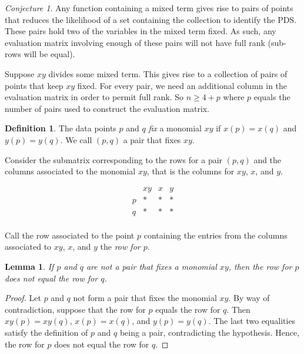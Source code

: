 \documentclass{amsart}
\newtheorem{lem}[thm]{Lemma}
\theoremstyle{definition}
\newtheorem{defn}[thm]{Definition}
\theoremstyle{remark}
\theoremstyle{example}
\theoremstyle{conjecture}
\newtheorem{conjecture}[thm]{Conjecture}
\numberwithin{equation}{section}
\begin{document}
\begin{conjecture}
Any function containing a mixed term gives rise to pairs
of points that reduces the likelihood of a set containing the
collection to identify the PDS.  These pairs hold two of the
variables in the mixed term fixed.  As such, any evaluation matrix
involving enough of these pairs will not have full rank (sub-rows
will be equal).
\end{conjecture}

Suppose $xy$ divides some mixed term.  This gives rise to a
collection of pairs of points that keep $xy$ fixed. %
For every pair, we need an additional column in the evaluation
matrix in order to permit full rank.  So $n\geq 4+p$ where $p$
equals the number of pairs used to construct the evaluation matrix.

\begin{defn}
The data points $p$ and $q$ \emph{fix} a monomial $xy$ if
$x(p)=x(q)$ and $y(p)=y(q)$.  We call $(p,q)$ a pair that fixes
$xy$.
\end{defn}

Consider the submatrix corresponding to the rows for a pair $(p,q)$
and the columns associated to the monomial $xy$, that is the columns
for $xy$, $x$, and $y$.

$$\begin{array}{c|ccc}
     & xy & x & y\\
     \hline
    p & * & * & * \\
    q & * & * & * \\
  \end{array}
$$

Call the row associated to the point $p$ containing the entries from
the columns associated to $xy$, $x$, and $y$ the \emph{row for $p$}.

\begin{lem}
If $p$ and $q$ are not a pair that fixes a monomial $xy$, then the
row for $p$ does not equal the row for $q$.
\end{lem}

\begin{proof}
Let $p$ and $q$ not form a pair that fixes the monomial $xy$.  By
way of contradiction, suppose that the row for $p$ equals the row
 for $q$.  Then $xy(p)=xy(q)$, $x(p)=x(q)$, and $y(p)=y(q)$.  The
 last two equalities satisfy the definition of $p$ and $q$ being a
 pair, contradicting the hypothesis.  Hence, the
row for $p$ does not equal the row for $q$.
\end{proof}
\end{document}
